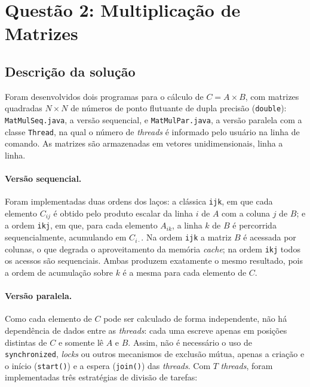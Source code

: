 \documentclass[12pt]{article}
\begin{document}
\section{Questão 2: Multiplicação de Matrizes}
\label{sec:q2}

\subsection{Descrição da solução}

Foram desenvolvidos dois programas para o cálculo de $C = A \times B$, com matrizes quadradas $N \times N$ de números de ponto flutuante de dupla precisão (\texttt{double}): \texttt{MatMulSeq.java}, a versão sequencial, e \texttt{MatMulPar.java}, a versão paralela com a classe \texttt{Thread}, na qual o número de \textit{threads} é informado pelo usuário na linha de comando. As matrizes são armazenadas em vetores unidimensionais, linha a linha.

\paragraph{Versão sequencial.} Foram implementadas duas ordens dos laços: a clássica \texttt{ijk}, em que cada elemento $C_{ij}$ é obtido pelo produto escalar da linha $i$ de $A$ com a coluna $j$ de $B$; e a ordem \texttt{ikj}, em que, para cada elemento $A_{ik}$, a linha $k$ de $B$ é percorrida sequencialmente, acumulando em $C_{i\cdot}$. Na ordem \texttt{ijk} a matriz $B$ é acessada por colunas, o que degrada o aproveitamento da memória \textit{cache}; na ordem \texttt{ikj} todos os acessos são sequenciais. Ambas produzem exatamente o mesmo resultado, pois a ordem de acumulação sobre $k$ é a mesma para cada elemento de $C$.

\paragraph{Versão paralela.} Como cada elemento de $C$ pode ser calculado de forma independente, não há dependência de dados entre as \textit{threads}: cada uma escreve apenas em posições distintas de $C$ e somente lê $A$ e $B$. Assim, não é necessário o uso de \texttt{synchronized}, \textit{locks} ou outros mecanismos de exclusão mútua, apenas a criação e o início (\texttt{start()}) e a espera (\texttt{join()}) das \textit{threads}. Com $T$ \textit{threads}, foram implementadas três estratégias de divisão de tarefas:
\end{document}
